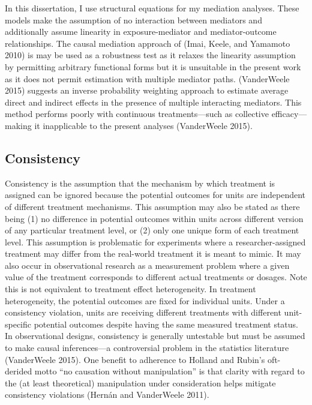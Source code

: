 \documentclass [11pt, proquest] {uwthesis}[2015/03/03]
\begin{document}
In this dissertation, I use structural equations for my mediation analyses. These models make the assumption of no interaction between mediators and additionally assume linearity in exposure-mediator and mediator-outcome relationships. The causal mediation approach of (Imai, Keele, and Yamamoto 2010) is may be used as a robustness test as it relaxes the linearity assumption by permitting arbitrary functional forms but it is unsuitable in the present work as it does not permit estimation with multiple mediator paths. (VanderWeele 2015) suggests an inverse probability weighting approach to estimate average direct and indirect effects in the presence of multiple interacting mediators. This method performs poorly with continuous treatments---such as collective efficacy---making it inapplicable to the present analyses (VanderWeele 2015).

\hypertarget{consistency}{%
\subsection{Consistency}\label{consistency}}

Consistency is the assumption that the mechanism by which treatment is assigned can be ignored because the potential outcomes for units are independent of different treatment mechanisms. This assumption may also be stated as there being (1) no difference in potential outcomes within units across different version of any particular treatment level, or (2) only one unique form of each treatment level. This assumption is problematic for experiments where a researcher-assigned treatment may differ from the real-world treatment it is meant to mimic. It may also occur in observational research as a measurement problem where a given value of the treatment corresponds to different actual treatments or dosages. Note this is not equivalent to treatment effect heterogeneity. In treatment heterogeneity, the potential outcomes are fixed for individual units. Under a consistency violation, units are receiving different treatments with different unit-specific potential outcomes despite having the same measured treatment status. In observational designs, consistency is generally untestable but must be assumed to make causal inferences---a controversial problem in the statistics literature (VanderWeele 2015). One benefit to adherence to Holland and Rubin's oft-derided motto ``no causation without manipulation'' is that clarity with regard to the (at least theoretical) manipulation under consideration helps mitigate consistency violations (Hernán and VanderWeele 2011).
\end{document}
